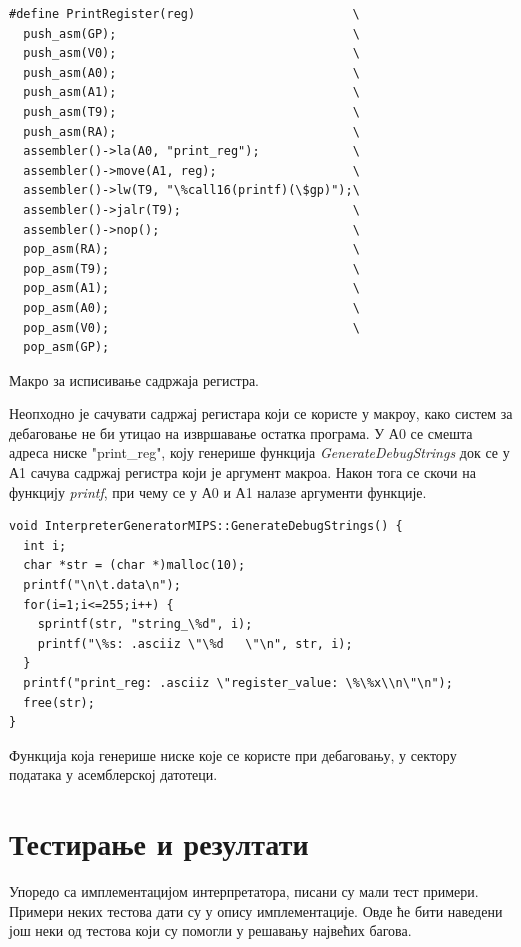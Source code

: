 \documentclass[12pt,oneside]{memoir}
\begin{document}
\begin{verbatim}
#define PrintRegister(reg)                      \
  push_asm(GP);                                 \
  push_asm(V0);                                 \
  push_asm(A0);                                 \
  push_asm(A1);                                 \
  push_asm(T9);                                 \
  push_asm(RA);                                 \
  assembler()->la(A0, "print_reg");             \
  assembler()->move(A1, reg);                   \
  assembler()->lw(T9, "\%call16(printf)(\$gp)");\
  assembler()->jalr(T9);                        \
  assembler()->nop();                           \
  pop_asm(RA);                                  \
  pop_asm(T9);                                  \
  pop_asm(A1);                                  \
  pop_asm(A0);                                  \
  pop_asm(V0);                                  \
  pop_asm(GP);                                  
\end{verbatim}
Макро за исписивање садржаја регистра.

Неопходно је сачувати садржај регистара који се користе у макроу, како систем за дебаговање не би утицао на извршавање остатка програма. У А0 се смешта адреса ниске "print\_reg", коју генерише функција \textit{GenerateDebugStrings} док се у А1 сачува садржај регистра који је аргумент макроа. Након тога се скочи на функцију \textit{printf}, при чему се у А0 и А1 налазе аргументи функције.\\

\begin{verbatim}
void InterpreterGeneratorMIPS::GenerateDebugStrings() {
  int i;
  char *str = (char *)malloc(10);
  printf("\n\t.data\n");
  for(i=1;i<=255;i++) {
    sprintf(str, "string_\%d", i);
    printf("\%s: .asciiz \"\%d   \"\n", str, i);
  }
  printf("print_reg: .asciiz \"register_value: \%\%x\\n\"\n");
  free(str);
}
\end{verbatim}
Функција која генерише ниске које се користе при дебаговању, у сектору података у асемблерској датотеци.

\section{Тестирање и резултати}
Упоредо са имплементацијом интерпретатора, писани су мали тест примери. Примери неких тестова дати су у опису имплементације. Овде ће бити наведени још неки од тестова који су помогли у решавању највећих багова.
\end{document}
